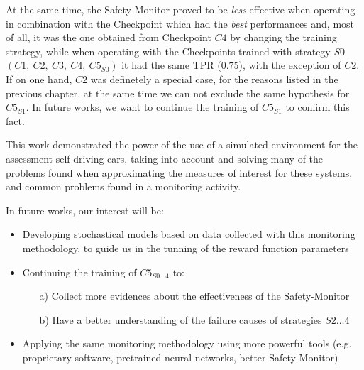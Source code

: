 At the same time, the Safety-Monitor proved to be \textsl{less} effective when operating in combination with the Checkpoint which had the \textsl{best} performances and, most of all, it was the one obtained from Checkpoint $C4$ by changing the training strategy, while when operating with the Checkpoints trained with strategy $S0$ $(C1,\: C2,\: C3,\: C4,\: C5_{S0})$ it had the same TPR ($0.75$), with the exception of $C2$. If on one hand, $C2$ was definetely a special case, for the reasons listed in the previous chapter, at the same time we can not exclude the same hypothesis for $C5_{S1}$. In future works, we want to continue the training of $C5_{S1}$ to confirm this fact.\newline

This work demonstrated the power of the use of a simulated environment for the assessment self-driving cars, taking into account and solving many of the problems found when approximating the measures of interest for these systems, and common problems found in a monitoring activity.

In future works, our interest will be:

\begin{itemize}
	\item Developing stochastical models based on data collected with this monitoring methodology, to guide us in the tunning of the reward function parameters
	\item Continuing the training of $C5_{S0\dots 4}$ to:
	\begin{itemize}
		\item[a)] Collect more evidences about the effectiveness of the Safety-Monitor
		\item[b)] Have a better understanding of the failure causes of strategies $S2\dots 4$
	\end{itemize}
	\item Applying the same monitoring methodology using more powerful tools (e.g. proprietary software, pretrained neural networks, better Safety-Monitor)
\end{itemize}
